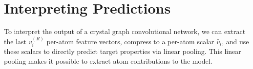 \documentclass[book.tex]{subfiles}
\begin{document}
\section{Interpreting Predictions}

To interpret the output of a crystal graph convolutional network, we can extract the last $v_i^{(R)}$ per-atom feature vectors, compress to a per-atom scalar $\tilde{v_i}$, and use these scalars to directly predict target properties via linear pooling. This linear pooling makes it possible to extract atom contributions to the model. 




\end{document}
